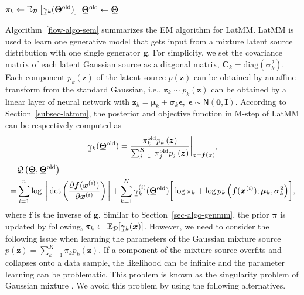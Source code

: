 \begin{algorithm}[!t]
\begin{algorithmic}[1]
    \STATE $\pi_k \gets \EE_{\Dd}\left[ \ubar{\gamma}_k(\ubar{\bm{\Theta}}^{\mathrm{old}}) \right]$%
    \STATE $\ubar{\bm{\Theta}}^{\mathrm{old}} \gets \ubar{\bm{\Theta}}$
    \ENDIF
    \ENDFOR
  \end{algorithmic}
\end{algorithm}


Algorithm~\ref{flow-algo-sem} summarizes the EM algorithm for LatMM.
LatMM is used to
learn one generative model that gets input from a mixture latent source
distribution with one single generator $\bm{g}$. For simplicity, we set
the covariance matrix of each latent Gaussian source as a diagonal
matrix, $\bm{C}_k = \mathrm{diag}(\bm{\sigma}_k^2) $. Each component $p_k(\bm{z})$ of
the latent source $p(\bm{z})$ can be obtained by an affine transform from
the standard Gaussian, {i.e.}, $\bm{z}_k \sim p_k(\bm{z})$ can be
obtained by a linear layer of neural network with $\bm{z}_k = \bm{\mu}_k
+ \bm{\sigma}_k \bm{\epsilon}, ~\bm{\epsilon} \sim \mathsf{N}(\bm{0}, \bm{I})$.
According to Section~\ref{subsec-latmm}, the posterior and objective function in M-step of LatMM can be respectively computed as
\begin{align}\label{em-latmm-gamma}
  \ubar{\gamma}_k(\ubar{\bm{\Theta}}^{\mathrm{old}}) = \frac{\pi_k^{\mathrm{old}} p_k\left(\bm{z}\right)}{\sum_{j=1}^K\;\pi_j^{\mathrm{old}} p_j\left(\bm{z}\right)}\bigg|_{\bm{z}=\bm{f}(\bm{x})},
\end{align}
\begin{align}\label{eq-latmm-obj}
  &\ubar{\Qq}\left( \ubar{\bm{\Theta}},\ubar{\bm{\Theta}}^{\mathrm{old}}\right) \nonumber \\
    =&\sum_{i=1}^n \log\;\bigg|\det\left(
    \pd{\bm{f}(\bm{x}^{(i)})}{\bm{x}^{(i)}} \right)\bigg| 
  + \sum_{k=1}^{K}\ubar{\gamma}_k^{(i)}(\ubar{\bm{\Theta}}^{\mathrm{old}})\bigg[ \log{\pi_k}
    +\log{p_k\left(\bm{f}(\bm{x}^{(i)}); \bm{\mu}_k, \bm{\sigma}_k^2\right)}\bigg], 
\end{align}
where $\bm{f}$ is the inverse of $\bm{g}$.
Similar to Section~\ref{sec-algo-genmm}, the prior $\bm{\pi}$ is updated by
following, $\pi_k \leftarrow \EE_{\Dd}[ \ubar{\gamma}_k(\bm{x})
]$. However, we need to consider the following issue when learning the parameters of
the Gaussian mixture source $p(\bm{z}) = \sum_{k=1}^K \pi_k p_k(\bm{z})$. If a component of the mixture source overfits and collapses onto a data sample, the likelihood can be infinite and the parameter learning can be problematic. This problem is known as the singularity problem of Gaussian mixture \cite{Bishop:2006:PRM:1162264}.
We avoid this problem by using the following alternatives.

